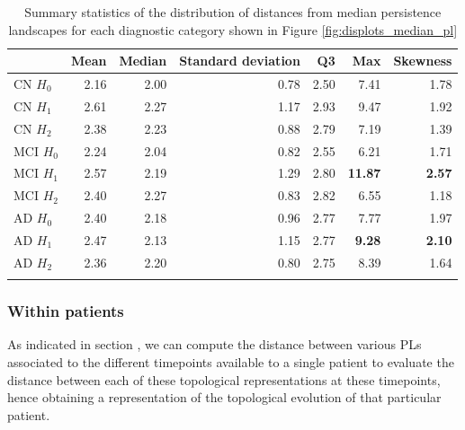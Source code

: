 \documentclass{article}
\begin{document}
\begin{table}
\centering
\begin{tabular}{lrrrrrr}
\toprule
{} &  Mean &  Median &  Standard deviation &   Q3 &   Max &  Skewness \\
\midrule
CN $H_0$ & 2.16 & 2.00 & 0.78 & 2.50 & 7.41 & 1.78 \\
CN $H_1$ & 2.61 & 2.27 & 1.17 & 2.93 & 9.47 & 1.92 \\
CN $H_2$ & 2.38 & 2.23 & 0.88 & 2.79 & 7.19 & 1.39 \\
MCI $H_0$ & 2.24 & 2.04 & 0.82 & 2.55 & 6.21 & 1.71 \\
MCI $H_1$ & 2.57 & 2.19 & 1.29 & 2.80 & \textbf{11.87} & \textbf{2.57} \\
MCI $H_2$ & 2.40 & 2.27 & 0.83 & 2.82 & 6.55 & 1.18 \\
AD $H_0$ & 2.40 & 2.18 & 0.96 & 2.77 & 7.77 & 1.97 \\
AD $H_1$ & 2.47 & 2.13 & 1.15 & 2.77 & \textbf{9.28} & \textbf{2.10} \\
AD $H_2$ & 2.36 & 2.20 & 0.80 & 2.75 & 8.39 & 1.64 \\
  \bottomrule
  \vspace{6pt}
\end{tabular}
\caption{Summary statistics of the distribution of distances from median persistence landscapes for each diagnostic category shown in Figure \ref{fig:displots_median_pl}}
\label{tab:stats_median_pl}
\end{table}


\subsubsection{Within patients}

As indicated in section \label{sec:tda_setup}, we can compute the distance between various PLs associated to the different timepoints available to a single patient to evaluate the distance between each of these topological representations at these timepoints, hence obtaining a representation of the topological evolution of that particular patient.
\end{document}
